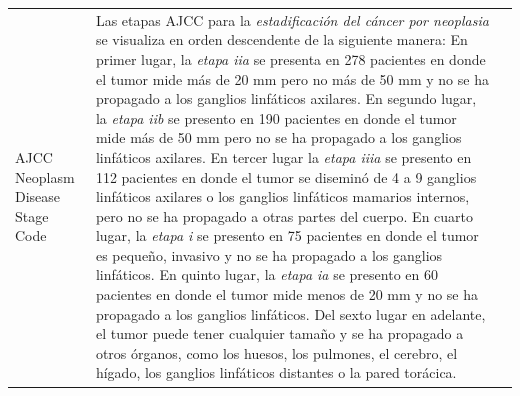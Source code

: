 \begin{table}[!htb]
	\footnotesize
	\begin{threeparttable}
		\begin{tabular}{p{2.5cm} p{7cm} p{6.5cm}} \toprule
			AJCC Neoplasm Disease Stage Code
			& Las etapas AJCC para la \textit{estadificación del cáncer por neoplasia} se visualiza en orden descendente de la siguiente manera: En primer lugar, la \textit{etapa iia} se presenta en 278 pacientes en donde el tumor mide más de 20 mm pero no más de 50 mm y no se ha propagado a los ganglios linfáticos axilares. En segundo lugar, la \textit{etapa iib} se presento en 190 pacientes en donde el tumor mide más de 50 mm pero no se ha propagado a los ganglios linfáticos axilares. En tercer lugar la \textit{etapa iiia} se presento en 112 pacientes en donde el tumor se diseminó de 4 a 9 ganglios linfáticos axilares o los ganglios linfáticos mamarios internos, pero no se ha propagado a otras partes del cuerpo. En cuarto lugar, la \textit{etapa i} se presento en 75 pacientes  en donde el tumor es pequeño, invasivo y no se ha propagado a los ganglios linfáticos. En quinto lugar, la \textit{etapa ia} se presento en 60 pacientes en donde el tumor mide menos de 20 mm  y no se ha propagado a los ganglios linfáticos. Del sexto lugar en adelante, el tumor puede tener cualquier tamaño y se ha propagado a otros órganos, como los huesos, los pulmones, el cerebro, el hígado, los ganglios linfáticos distantes o la pared torácica.
			

\end{tabular}
\end{threeparttable}
\end{table}
